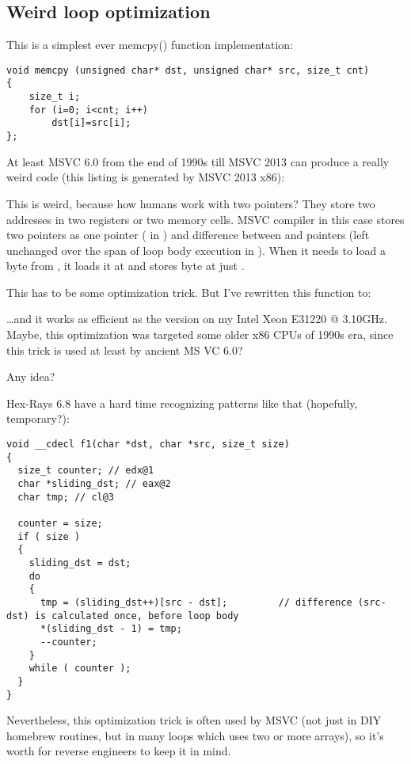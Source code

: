 \subsection{Weird loop optimization}

This is a simplest ever memcpy() function implementation:

\begin{lstlisting}
void memcpy (unsigned char* dst, unsigned char* src, size_t cnt)
{
	size_t i;
	for (i=0; i<cnt; i++)
		dst[i]=src[i];
};
\end{lstlisting}

At least MSVC 6.0 from the end of 1990s till MSVC 2013 can produce a really weird code (this listing is generated by MSVC 2013 x86):



This is weird, because how humans work with two pointers? They store two addresses in two registers or two memory cells.
MSVC compiler in this case stores two pointers as one pointer ( in \EAX) 
and difference between  and  pointers (left unchanged over the span of loop body execution in \ESI).
When it needs to load a byte from , it loads it at  and stores byte
at just .

This has to be some optimization trick. But I've rewritten this function to:



\dots and it works as efficient as the  version on my Intel Xeon E31220 @ 3.10GHz.
Maybe, this optimization was targeted some older x86 CPUs of 1990s era, since this trick is used at least by ancient MS VC 6.0?

Any idea?

Hex-Rays 6.8 have a hard time recognizing patterns like that (hopefully, temporary?):

\begin{lstlisting}
void __cdecl f1(char *dst, char *src, size_t size)
{
  size_t counter; // edx@1
  char *sliding_dst; // eax@2
  char tmp; // cl@3

  counter = size;
  if ( size )
  {
    sliding_dst = dst;
    do
    {
      tmp = (sliding_dst++)[src - dst];         // difference (src-dst) is calculated once, before loop body
      *(sliding_dst - 1) = tmp;
      --counter;
    }
    while ( counter );
  }
}
\end{lstlisting}

Nevertheless, this optimization trick is often used by MSVC (not just in \ac{DIY} homebrew  routines,
but in many loops which uses two or more arrays),
so it's worth for reverse engineers to keep it in mind.


